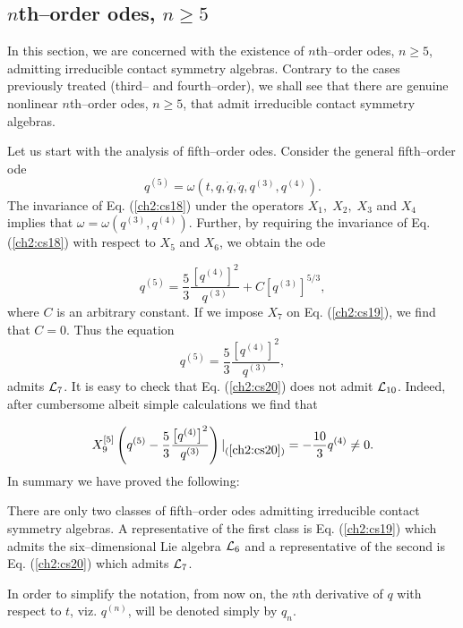 \subsection{$n$th--order odes, $n \ge 5$} 
In this section, we are concerned with the existence of $n$th--order odes,
$n\ge 5$, admitting irreducible contact symmetry algebras. Contrary to
the cases previously treated (third-- and fourth--order), we shall see that
there are genuine nonlinear $n$th--order odes, $n\ge 5$, that admit
irreducible contact symmetry algebras. 

Let us start with the analysis of fifth--order odes. Consider the general
fifth--order ode
\begin{equation}
\label{ch2:cs18}
q^{(5)}=\omega (t,q,\dot q,\ddot q, q^{(3)},q^{(4)}).
\end{equation}
The invariance of Eq. (\ref{ch2:cs18}) under the operators $X_1,\;X_2,\;X_3$ and
$X_4$ implies that $\omega =\omega (q^{(3)},q^{(4)})$. Further, by requiring
the invariance of Eq. (\ref{ch2:cs18}) with respect to $X_5$ and $X_6$, we obtain
the ode

\begin{equation}
\label{ch2:cs19}
q^{(5)}=\frac{5}{3}\frac{\left [q^{(4)}\right ]^2 }{q^{(3)}}
+C\left [q^{(3)}\right ]^{5/3},
\end{equation}
where $C$ is an arbitrary constant. If we  impose $X_7$  on Eq. (\ref{ch2:cs19}),
we find that $C=0$. Thus  the equation
\begin{equation}
\label{ch2:cs20}
q^{(5)}=\frac{5}{3}\frac{\left [q^{(4)}\right ]^2 }{q^{(3)}} ,
\end{equation}
admits ${\cal L}_7$. It is easy to check that Eq. (\ref{ch2:cs20}) does not admit
${\cal L}_{10}$. Indeed, after cumbersome albeit simple
calculations we find that

\[ X_9^{[5]}\left (
q^{(5)}-\frac{5}{3}\frac{\left [q^{(4)}\right ]^2 }{q^{(3)}} \right )
|_{(\ref{ch2:cs20})}=-\frac{10}{3}q^{(4)} \ne 0. \]
In summary we have proved the following:
\begin{theo}
\label{ch2:5cont}
\begin{em}
There are only two classes of fifth--order odes admitting irreducible contact
symmetry algebras. A representative of the first class is Eq. (\ref{ch2:cs19}) which
admits the six--dimensional Lie algebra ${\cal L}_6$ and a representative of the
second is Eq. (\ref{ch2:cs20}) which admits ${\cal L}_7$.
\end{em}
\end{theo}
In order to simplify the notation, from now on, the $n$th derivative of $q$
with respect to $t$, viz. $q^{(n)}$, will be denoted simply by $q_n$. 

